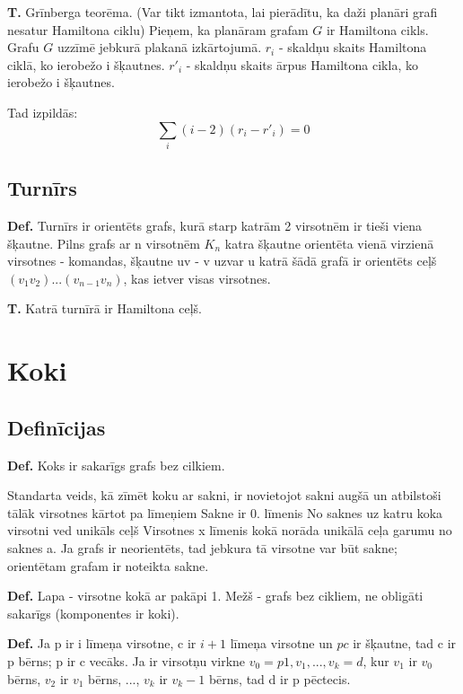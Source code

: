 \documentclass{article}
\begin{document}
\textbf{T. } Grīnberga teorēma. (Var tikt izmantota, lai pierādītu, ka daži planāri grafi nesatur Hamiltona ciklu) Pieņem, ka planāram grafam $ G $ ir Hamiltona cikls. Grafu $ G $ uzzīmē jebkurā plakanā izkārtojumā.  $r_i$ - skaldņu skaits Hamiltona ciklā, ko ierobežo i šķautnes.  $r'_i$ - skaldņu skaits ārpus Hamiltona cikla, ko ierobežo i šķautnes.

Tad izpildās:
\begin{equation}
	\sum_{i}{}(i − 2)(r_i − r'_i ) = 0
\end{equation}

\subsection{Turnīrs}

\textbf{Def.}  Turnīrs ir orientēts grafs, kurā starp katrām 2 virsotnēm ir tieši viena šķautne. Pilns grafs ar n virsotnēm $K_n$ katra šķautne orientēta vienā virzienā virsotnes - komandas, šķautne uv - v uzvar u katrā šādā grafā ir orientēts ceļš $(v_1 v_2 )...(v_{n−1} v_n )$, kas ietver visas virsotnes.

\textbf{T. } Katrā turnīrā ir Hamiltona ceļš.

\section{Koki}

\subsection{Definīcijas}

\textbf{Def.}  Koks ir sakarīgs grafs bez cilkiem.

Standarta veids, kā zīmēt koku ar sakni, ir novietojot sakni augšā un atbilstoši tālāk virsotnes kārtot pa līmeņiem Sakne ir 0. līmenis No saknes uz katru koka virsotni ved unikāls ceļš Virsotnes x līmenis kokā norāda unikālā ceļa garumu no saknes a.  Ja grafs ir neorientēts, tad jebkura tā virsotne var būt sakne; orientētam grafam ir noteikta sakne.

\textbf{Def.}  Lapa - virsotne kokā ar pakāpi 1.  Mežš - grafs bez cikliem, ne obligāti sakarīgs (komponentes ir koki).

\textbf{Def.}  Ja p ir i līmeņa virsotne, c ir $i + 1$ līmeņa virsotne un $pc$ ir šķautne, tad c ir p bērns; p ir c vecāks.  Ja ir virsotņu virkne $v_0 = p1 , v_1 , ..., v_k = d$, kur $v_1$ ir $v_0$ bērns, $v_2$ ir $v_1$ bērns, ..., $v_k$ ir $v_k −1$ bērns, tad d ir p pēctecis.
\end{document}
